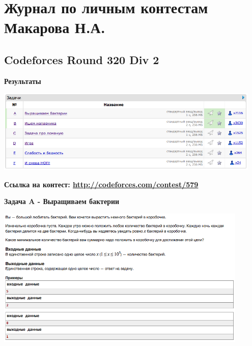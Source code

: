 \documentclass[a4paper,12pt]{article}
\begin{document}
%
%

\newpage
\section{Журнал по личным контестам Макарова Н.А.}

%
%

\subsection{Codeforces Round 320 Div 2}

\textbf{{\large Результаты}} \\
\begin{center}
\includegraphics[width=0.95\textwidth]{C_320/result.png}\\ [1cm]
\end{center}

\textbf{{\large Ссылка на контест: \url{http://codeforces.com/contest/579}}}

\newpage
\textbf{{\large Задача A - Выращиваем бактерии}}

\begin{center}
\includegraphics[width=0.9\textwidth]{C_320/A.png}\\ [1cm]
\end{center}
\end{document}
